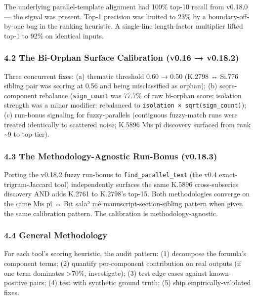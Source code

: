 \documentclass[
  11pt,
  letterpaper,
]{article}
\begin{document}
The underlying parallel-template alignment had 100\% top-10 recall from
v0.18.0 --- the signal was present. Top-1 precision was limited to 23\%
by a boundary-off-by-one bug in the ranking heuristic. A single-line
length-factor multiplier lifted top-1 to 92\% on identical inputs.

\subsubsection{4.2 The Bi-Orphan Surface Calibration (v0.16 →
v0.18.2)}\label{the-bi-orphan-surface-calibration-v0.16-v0.18.2}

Three concurrent fixes: (a) thematic threshold 0.60 → 0.50 (K.2798 ↔
Si.776 sibling pair was scoring at 0.56 and being misclassified as
orphan); (b) score-component rebalance (\texttt{sign\_count} was 77.7\%
of raw bi-orphan score; isolation strength was a minor modifier;
rebalanced to \texttt{isolation\ ×\ sqrt(sign\_count)}); (c) run-bonus
signaling for fuzzy-parallels (contiguous fuzzy-match runs were treated
identically to scattered noise; K.5896 Mīs pî discovery surfaced from
rank \textasciitilde9 to top-tier).

\subsubsection{4.3 The Methodology-Agnostic Run-Bonus
(v0.18.3)}\label{the-methodology-agnostic-run-bonus-v0.18.3}

Porting the v0.18.2 fuzzy run-bonus to \texttt{find\_parallel\_text}
(the v0.4 exact-trigram-Jaccard tool) independently surfaces the same
K.5896 cross-subseries discovery AND adds K.2761 to K.2798's top-15.
Both methodologies converge on the same Mīs pî ↔ Bīt salāʾ mê
manuscript-section-sibling pattern when given the same calibration
pattern. The calibration is methodology-agnostic.

\subsubsection{4.4 General Methodology}\label{general-methodology}

For each tool's scoring heuristic, the audit pattern: (1) decompose the
formula's component terms; (2) quantify per-component contribution on
real outputs (if one term dominates \textgreater70\%, investigate); (3)
test edge cases against known-positive pairs; (4) test with synthetic
ground truth; (5) ship empirically-validated fixes.
\end{document}
